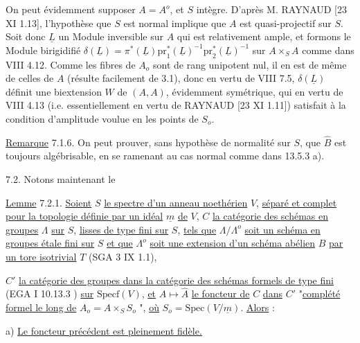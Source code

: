 On peut évidemment supposer $A=A^o$, et $S$ intègre. D'après M. RAYNAUD [23 XI 1.13], l'hypothèse que $S$ est normal implique que $A$ est quasi-projectif sur $S$. Soit donc $\underline{L}$ un Module inversible sur $A$ qui est relativement ample, et formons le Module birigidifié $\delta(\underline{L}) = \pi^*(\underline{L})\mathrm{pr}_1^*(\underline{L})^{-1}\mathrm{pr}_2^*(\underline{L})^{-1}$ sur $A\times_S A$ comme dans VIII 4.12. Comme les fibres de $A_o$ sont de rang unipotent nul, il en est de même de celles de $A$ (résulte facilement de 3.1), donc en vertu de VIII 7.5, $\delta(\underline{L})$ définit une biextension $W$ de $(A,A)$, évidemment symétrique, qui en vertu de VIII 4.13 (i.e. essentiellement en vertu de RAYNAUD [23 XI 1.11]) satisfait à la condition d'amplitude voulue en les points de $S_o$.

\underline{Remarque} 7.1.6. On peut prouver, sans hypothèse de normalité sur $S$, que $\hat{B}$ est toujours algébrisable, en se ramenant au cas normal comme dans 13.5.3 a).

7.2. Notons maintenant le

\underline{Lemme} 7.2.1. \underline{Soient} $S$ \underline{le spectre d'un anneau noethérien} $V$, \underline{séparé et complet pour la topologie définie par un idéal} $\underline{m}$ \underline{de} $V$, $C$ \underline{la catégorie des schémas en groupes} $\Lambda$ \underline{sur} $S$, \underline{lisses de type fini sur} $S$, \underline{tels que} $\Lambda/\Lambda^o$ \underline{soit un schéma en groupes étale fini sur} $S$ \underline{et que} $\Lambda^o$ \underline{soit une extension d'un schéma abélien} $B$ \underline{par un tore isotrivial} $T$ (SGA 3 IX 1.1),



$C'$ \underline{la catégorie des groupes dans la catégorie des schémas formels de type fini} (EGA I 10.13.3 ) \underline{sur} $\mathrm{Specf}(V)$, \underline{et} $A \longmapsto \hat{A}$ \underline{le foncteur de} $C$ \underline{dans} $C'$ "\underline{complété formel le long de} $A_o = A \times_S S_o$ ", \underline{où} $S_o = \mathrm{Spec}(V/\underline{m})$. \underline{Alors} :

a) \underline{Le foncteur précédent est pleinement fidèle.}

